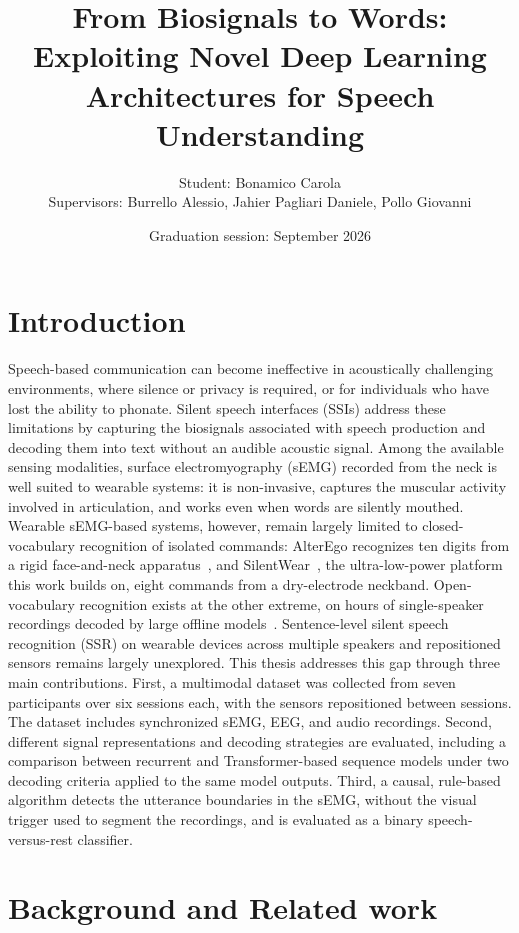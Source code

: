 \documentclass{article}
\title{From Biosignals to Words: Exploiting Novel Deep Learning Architectures for Speech Understanding}
\author{Student: Bonamico Carola \\
Supervisors: Burrello Alessio, Jahier Pagliari Daniele, Pollo Giovanni}
\date{Graduation session: September 2026}
\begin{document}
\maketitle

\section{Introduction}

Speech-based communication can become ineffective in acoustically challenging environments, where silence or privacy is required, or for individuals who have lost the ability to phonate. Silent speech interfaces (SSIs) address these limitations by capturing the biosignals associated with speech production and decoding them into text without an audible acoustic signal. Among the available sensing modalities, surface electromyography (sEMG) recorded from the neck is well suited to wearable systems: it is non-invasive, captures the muscular activity involved in articulation, and works even when words are silently mouthed.
Wearable sEMG-based systems, however, remain largely limited to closed-vocabulary recognition of isolated commands: AlterEgo recognizes ten digits from a rigid face-and-neck apparatus~\cite{Kapur2018_AlterEgo}, and SilentWear~\cite{Spacone2026_SilentWear}, the ultra-low-power platform this work builds on, eight commands from a dry-electrode neckband. Open-vocabulary recognition exists at the other extreme, on hours of single-speaker recordings decoded by large offline models~\cite{Gaddy2020_DigitalVoicing}. Sentence-level silent speech recognition (SSR) on wearable devices across multiple speakers and repositioned sensors remains largely unexplored.
This thesis addresses this gap through three main contributions. First, a multimodal dataset was collected from seven participants over six sessions each, with the sensors repositioned between sessions. The dataset includes synchronized sEMG, EEG, and audio recordings. Second, different signal representations and decoding strategies are evaluated, including a comparison between recurrent and Transformer-based sequence models under two decoding criteria applied to the same model outputs. Third, a causal, rule-based algorithm detects the utterance boundaries in the sEMG, without the visual trigger used to segment the recordings, and is evaluated as a binary speech-versus-rest classifier.

\section{Background and Related work}
\end{document}
